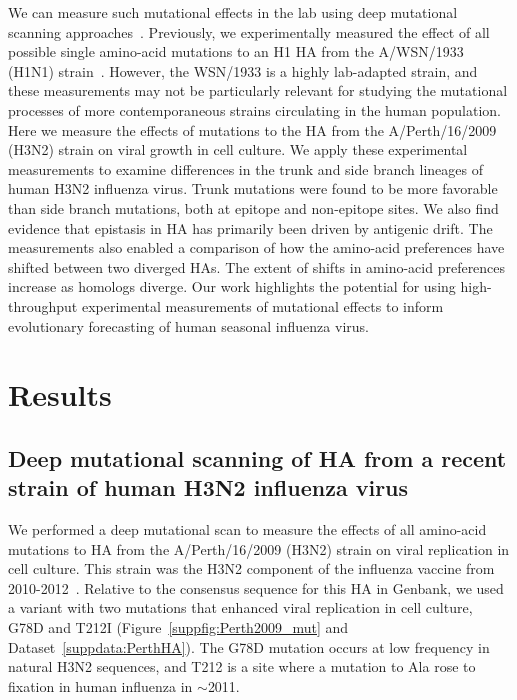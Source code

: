 \documentclass[9pt,twocolumn,twoside]{pnas-new}
\begin{document}
We can measure such mutational effects in the lab using deep mutational scanning approaches~\cite{fowler2010high}.
Previously, we experimentally measured the effect of all possible single amino-acid mutations to an H1 HA from the A/WSN/1933 (H1N1) strain~\cite{thyagarajan2014inherent,doud2016accurate}.
However, the WSN/1933 is a highly lab-adapted strain, and these measurements may not be particularly relevant for studying the mutational processes of more contemporaneous strains circulating in the human population.
Here we measure the effects of mutations to the HA from the A/Perth/16/2009 (H3N2) strain on viral growth in cell culture.
We apply these experimental measurements to examine differences in the trunk and side branch lineages of human H3N2 influenza virus.
Trunk mutations were found to be more favorable than side branch mutations, both at epitope and non-epitope sites.
We also find evidence that epistasis in HA has primarily been driven by antigenic drift.
The measurements also enabled a comparison of how the amino-acid preferences have shifted between two diverged HAs.
The extent of shifts in amino-acid preferences increase as homologs diverge.
Our work highlights the potential for using high-throughput experimental measurements of mutational effects to inform evolutionary forecasting of human seasonal influenza virus.

\section*{Results}
\label{sec:results}

\subsection*{Deep mutational scanning of HA from a recent strain of human H3N2 influenza virus}
We performed a deep mutational scan to measure the effects of all amino-acid mutations to HA from the A/Perth/16/2009 (H3N2) strain on viral replication in cell culture. 
This strain was the H3N2 component of the influenza vaccine from 2010-2012~\cite{who2010d,who2011}.
Relative to the consensus sequence for this HA in Genbank, we used a variant with two mutations that enhanced viral replication in cell culture, G78D and T212I (Figure~\ref{suppfig:Perth2009_mut} and Dataset~\ref{suppdata:PerthHA}).
The G78D mutation occurs at low frequency in natural H3N2 sequences, and T212 is a site where a mutation to Ala rose to fixation in human influenza in $\sim$2011.
\end{document}
